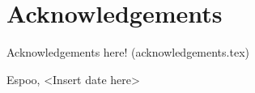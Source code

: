 
\chapter*{Acknowledgements}

Acknowledgements here! (acknowledgements.tex) 

\vskip 10mm
\noindent Espoo, <Insert date here> %
\vskip 20mm
\noindent\AUTHOR
